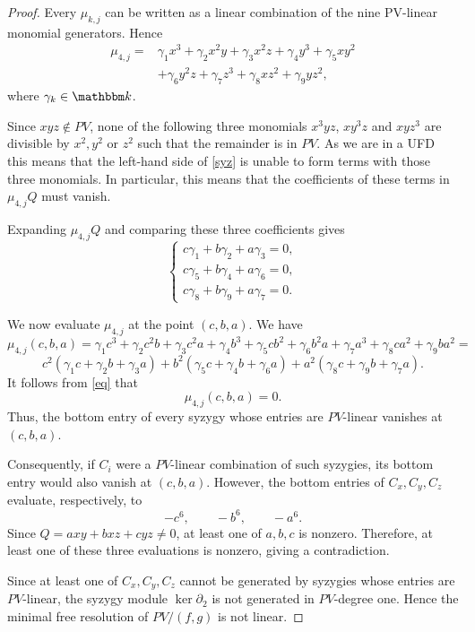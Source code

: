\begin{proof}
Every $\mu_{k,j}$ can be written as a linear
combination of the nine PV-linear monomial generators. Hence
\[
\begin{aligned}
\mu_{4,j}={}&
\gamma_1x^3+\gamma_2x^2y+\gamma_3x^2z
+\gamma_4y^3+\gamma_5xy^2\\
&+\gamma_6y^2z+\gamma_7z^3
+\gamma_8xz^2+\gamma_9yz^2,
\end{aligned}
\]
where $\gamma_k\in\K$.

Since $xyz\notin PV$, none of the following three monomials $x^3yz$, $xy^3z$ and
$xyz^3$ are divisible by $x^2,y^2$ or $z^2$ such that the remainder is in $PV$. As we are in a UFD this means that the left-hand side of \eqref{syz} is unable to form terms with those three monomials. In particular, this means that the coefficients of these terms in $\mu_{4,j}Q$ must vanish.

Expanding $\mu_{4,j}Q$ and comparing these three
coefficients gives
\begin{equation}\label{eq}
\begin{cases}
c\gamma_1+b\gamma_2+a\gamma_3=0,\\
c\gamma_5+b\gamma_4+a\gamma_6=0,\\
c\gamma_8+b\gamma_9+a\gamma_7=0.
\end{cases}
\end{equation}

We now evaluate $\mu_{4,j}$ at the point $(c,b,a)$. We have
\[
\mu_{4,j}(c,b,a)
=\gamma_1c^3+\gamma_2c^2b+\gamma_3c^2a
+\gamma_4b^3+\gamma_5cb^2+\gamma_6b^2a
+\gamma_7a^3+\gamma_8ca^2+\gamma_9ba^2
=\]\[c^2(\gamma_1c+\gamma_2b+\gamma_3a)
+b^2(\gamma_5c+\gamma_4b+\gamma_6a)
+a^2(\gamma_8c+\gamma_9b+\gamma_7a). 
\]
It follows from \eqref{eq} that
\[
\mu_{4,j}(c,b,a)=0.
\]
Thus, the bottom entry of every syzygy whose entries are
$PV$-linear vanishes at $(c,b,a)$.

Consequently, if $C_i$ were a $PV$-linear combination of
such syzygies, its bottom entry would also vanish at
$(c,b,a)$. However, the bottom entries of $C_x,C_y,C_z$
evaluate, respectively, to
\[
-c^6,\qquad -b^6,\qquad -a^6.
\]
Since $Q=axy+bxz+cyz\neq 0$, at least one of $a,b,c$ is
nonzero. Therefore, at least one of these three evaluations
is nonzero, giving a contradiction.

Since at least one of $C_x,C_y,C_z$ cannot be generated
by syzygies whose entries are $PV$-linear, the syzygy module $\ker \partial_2$ is not generated in $PV$-degree one. Hence the minimal free resolution of $PV/(f,g) $ is not linear.
\end{proof}

